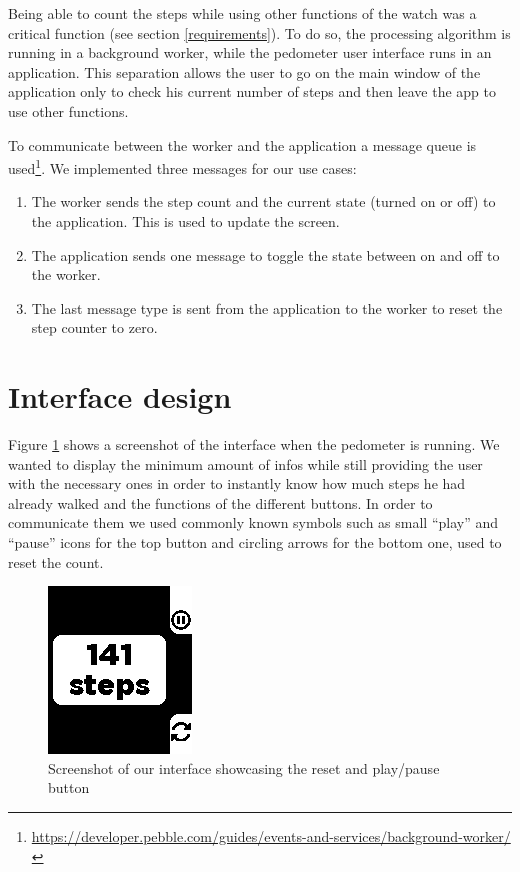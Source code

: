 \documentclass[12pt,twoside,a4paper]{article}
\begin{document}
Being able to count the steps while using other functions of the watch was a critical function (see section \ref{requirements}).
To do so, the processing algorithm is running in a background worker, while the pedometer user interface runs in an application.
This separation allows the user to go on the main window of the application only to check his current number of steps and then leave the app to use other functions.

To communicate between the worker and the application a message queue is used\footnote{\url{https://developer.pebble.com/guides/events-and-services/background-worker/}}.
We implemented three messages for our use cases:
\begin{enumerate}
    \item The worker sends the step count and the current state (turned on or off) to the application.
        This is used to update the screen.
    \item The application sends one message to toggle the state between on and off to the worker.
    \item The last message type is sent from the application to the worker to reset the step counter to zero.
\end{enumerate}

\section{Interface design}
Figure \ref{fig:interface} shows a screenshot of the interface when the pedometer is running. We wanted to display the 
minimum amount of infos while still providing the user with the necessary ones in order to instantly know how much 
steps he had already walked and the functions of the different buttons. In order to communicate them we used commonly 
known symbols such as small ``play'' and ``pause'' icons for the top button and circling arrows for the bottom one, 
used to reset the count.
\begin{figure}[h]
    \centering
    \includegraphics{screenshot}
    \caption{Screenshot of our interface showcasing the reset and play/pause button}
    \label{fig:interface}
\end{figure}
\end{document}
